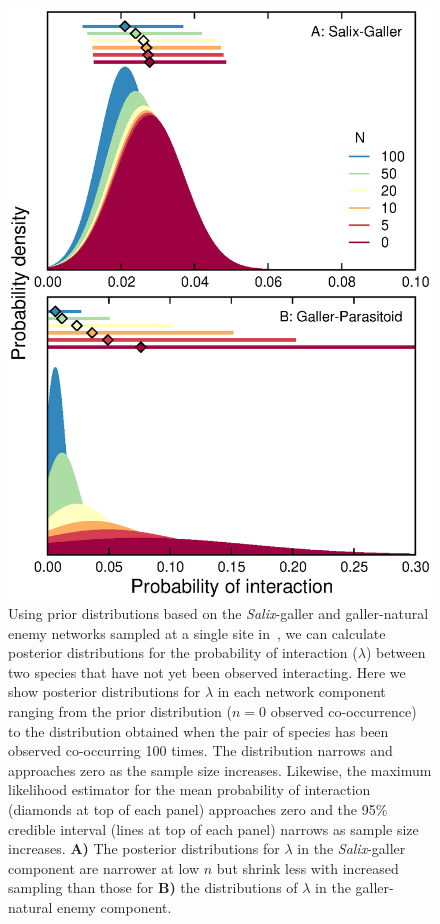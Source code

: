 \documentclass[12pt]{article}
\begin{document}


      \begin{figure}[ht]
        \caption{Using prior distributions based on the \emph{Salix}-galler and galler-natural enemy networks sampled at a single site in~\citet{Kopelke2017}, we can calculate posterior distributions for the probability of interaction ($\lambda$) between two species that have not yet been observed interacting. Here we show posterior distributions for $\lambda$ in each network component ranging from the prior distribution ($n=0$ observed co-occurrence) to the distribution obtained when the pair of species has been observed co-occurring 100 times. The distribution narrows and approaches zero as the sample size increases. Likewise, the maximum likelihood estimator for the mean probability of interaction (diamonds at top of each panel) approaches zero and the 95\% credible interval (lines at top of each panel) narrows as sample size increases. \textbf{A)} The posterior distributions for $\lambda$ in the \emph{Salix}-galler component are narrower at low $n$ but shrink less with increased sampling than those for \textbf{B)} the distributions of $\lambda$ in the galler-natural enemy component.}
        \label{Salix_pdfs}
        \includegraphics*[width=.8\textwidth]{figures/Salix_Galler_pdfs_increasing_N_Zillis.eps}
        \end{figure}
\end{document}
